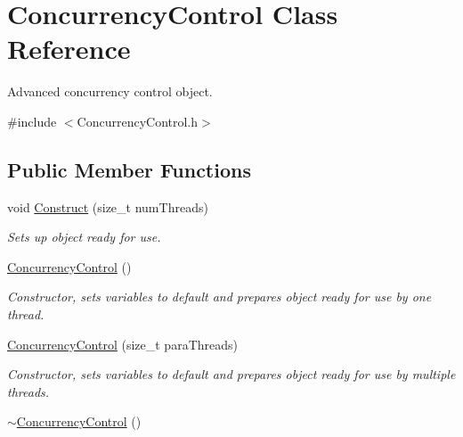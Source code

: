 \hypertarget{class_concurrency_control}{
\section{ConcurrencyControl Class Reference}
\label{class_concurrency_control}
}


Advanced concurrency control object.  




{\ttfamily \#include $<$ConcurrencyControl.h$>$}

\subsection*{Public Member Functions}
\begin{DoxyCompactItemize}
\item 
void \hyperlink{class_concurrency_control_a24e5689f704351208afc2cb7b4efbcec}{Construct} (size\_\-t numThreads)
\begin{DoxyCompactList}\small\item\em Sets up object ready for use. \item\end{DoxyCompactList}\item 
\hypertarget{class_concurrency_control_aafb06df9571b135c04f5ee6e60e734d8}{
\hyperlink{class_concurrency_control_aafb06df9571b135c04f5ee6e60e734d8}{ConcurrencyControl} ()}
\label{class_concurrency_control_aafb06df9571b135c04f5ee6e60e734d8}

\begin{DoxyCompactList}\small\item\em Constructor, sets variables to default and prepares object ready for use by one thread. \item\end{DoxyCompactList}\item 
\hyperlink{class_concurrency_control_a3ef5edee9c033b9725556fd153312e22}{ConcurrencyControl} (size\_\-t paraThreads)
\begin{DoxyCompactList}\small\item\em Constructor, sets variables to default and prepares object ready for use by multiple threads. \item\end{DoxyCompactList}\item 
\hypertarget{class_concurrency_control_a516fa47be5e1e196786ec77ec1909159}{
\hyperlink{class_concurrency_control_a516fa47be5e1e196786ec77ec1909159}{$\sim$ConcurrencyControl} ()}
\label{class_concurrency_control_a516fa47be5e1e196786ec77ec1909159}


\end{DoxyCompactItemize}
